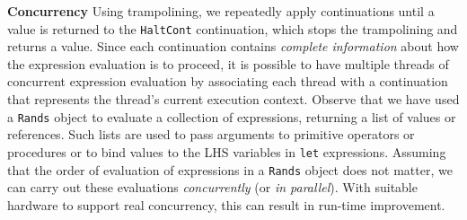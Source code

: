 \begin{minipage}[t]{\sw}
\slidenumber
\LARGE
{\bf Concurrency}\exx
Using trampolining, we repeatedly apply continuations
until a value is returned to the \verb'HaltCont' continuation,
which stops the trampolining and returns a value.
Since each continuation contains {\em complete information}
about how the expression evaluation is to proceed,
it is possible to have multiple threads of concurrent expression evaluation
by associating each thread with a continuation
that represents the thread's current execution context.\exx
Observe that we have used a \verb'Rands' object
to evaluate a collection of expressions,
returning a list of values or references.
Such lists are used to pass arguments
to primitive operators or procedures
or to bind values to the LHS variables in \verb'let' expressions.\exx
Assuming that the order of evaluation
of expressions in a \verb'Rands' object does not matter,
we can carry out these evaluations {\em concurrently}
(or {\em in parallel}).
With suitable hardware to support real concurrency,
this can result in run-time improvement.
\end{minipage}
